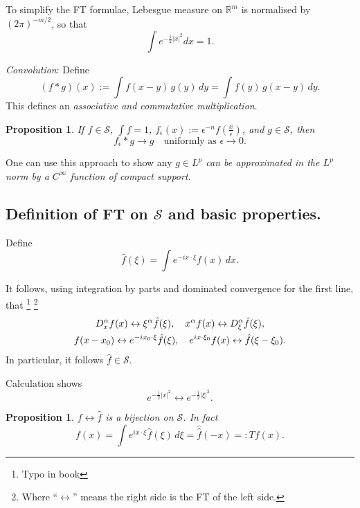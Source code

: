 \documentclass[a4paper]{amsbook}
\theoremstyle{plain}
\newtheorem{proposition}[theorem]{Proposition}
\theoremstyle{definition}
\theoremstyle{remark}
\begin{document}
  To simplify the FT formulae, Lebesgue measure on $ \mathbb{R}^m $ is normalised by $ (2\pi)^{-m/2} $, so that
  \[
  \int e^{-\frac{1}{2} |x|^2} dx   = 1.
  \]
  
 \emph{Convolution}: 
  Define
  \[
  (f*g)(x) := \int f(x-y)\, g(y)\, dy = \int f(y)\, g(x-y)\,  dy.
  \]
  This defines an \emph{associative and commutative multiplication}.
  
  \begin{proposition}  If $ f \in \mathcal{S} $, $ \int f = 1 $, $ f_\epsilon (x) := \epsilon ^{-n}f \left(\frac{x}{\epsilon } \right) $, 
 and $g  \in \mathcal{S} $, then  
\[
f_\epsilon * g \to g \quad \text{uniformly  as } \epsilon \to 0 .
\]  
\end{proposition}

One can use this approach to show any \emph{$ g\in L^p $ can be approximated in the $ L^p $ norm by a $ C^\infty $ function of compact support}.  
  
  
\subsection{Definition of FT on $ \mathcal{S}$ and basic properties.}
 Define 
 \[
 \hat{f}( \xi ) = \int e^{-ix\cdot \xi } f(x) \, dx.
 \]
 
 It follows, using integration by parts and dominated convergence for the first line, that %
 \footnote{Typo in book}
 \footnote{Where ``$ \leftrightarrow $'' means the right side is the FT of the left side.}
\begin{gather}
\notag  D^\alpha_x f (x)  \leftrightarrow \xi^ \alpha \hat{f}( \xi ), 
                                    \quad  x^ \alpha f(x) \leftrightarrow D^ \alpha_\xi \hat{f} ( \xi ),\\
 f(x-x_0)  \leftrightarrow e^{-ix_0\cdot \xi} \hat{f}(\xi), 
                   \quad e^{ ix\cdot \xi_0 } f(x) \leftrightarrow \hat{f}(\xi-\xi_0). \label{tm}
\end{gather} 
 In particular, it follows $ \hat{f} \in \mathcal{S} $.

Calculation shows
\[
e^{-\frac{1}{2} |x|^2} \leftrightarrow e^{-\frac{1}{2} |\xi|^2} .
\]

\begin{proposition}  $ f \leftrightarrow \hat{f} $ is a bijection on $ \mathcal{S} $.  In fact
\[
f(x) = \int e^{ix\cdot \xi } \hat{f} (\xi)\, d\xi = \hat{\hat{f}} (-x) =: Tf(x).
\]
\end{proposition}
\end{document}
